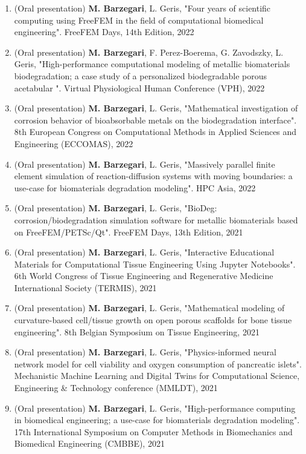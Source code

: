 \documentclass{cv}
\begin{document}
\begin{enumerate}[itemsep=-0.2ex]
\item
(Oral presentation) 
\textbf{M. Barzegari}, L. Geris, "Four years of scientific computing using FreeFEM in the field of computational biomedical engineering". FreeFEM Days, 14th Edition, 2022
\item
(Oral presentation) 
\textbf{M. Barzegari}, F. Perez-Boerema, G. Zavodszky, L. Geris, "High-performance computational modeling of metallic biomaterials biodegradation; a case study of a personalized biodegradable porous acetabular ". Virtual Physiological Human Conference (VPH), 2022
\item
(Oral presentation) 
\textbf{M. Barzegari}, L. Geris, "Mathematical investigation of corrosion behavior of bioabsorbable metals on the biodegradation interface". 8th European Congress on Computational Methods in Applied Sciences and Engineering (ECCOMAS), 2022
\item
(Oral presentation) 
\textbf{M. Barzegari}, L. Geris, "Massively parallel finite element simulation of reaction-diffusion systems with moving boundaries: a use-case for biomaterials degradation modeling". HPC Asia, 2022
\item
(Oral presentation) 
\textbf{M. Barzegari}, L. Geris, "BioDeg: corrosion/biodegradation simulation software for metallic biomaterials based on FreeFEM/PETSc/Qt". FreeFEM Days, 13th Edition, 2021
\item
(Oral presentation) 
\textbf{M. Barzegari}, L. Geris, "Interactive Educational Materials for Computational Tissue Engineering Using Jupyter Notebooks". 6th World Congress of Tissue Engineering and Regenerative Medicine International Society (TERMIS), 2021
\item
(Oral presentation) 
\textbf{M. Barzegari}, L. Geris, "Mathematical modeling of curvature-based cell/tissue growth on open porous scaffolds for bone tissue engineering". 8th Belgian Symposium on Tissue Engineering, 2021
\item
(Oral presentation)
\textbf{M. Barzegari}, L. Geris, "Physics-informed neural network model for cell viability and oxygen consumption of pancreatic islets". Mechanistic Machine Learning and Digital Twins for Computational Science, Engineering \& Technology conference (MMLDT), 2021
\item
(Oral presentation)
\textbf{M. Barzegari}, L. Geris, "High-performance computing in biomedical engineering; a use-case for biomaterials degradation modeling". 17th International Symposium on Computer Methods in Biomechanics and Biomedical Engineering (CMBBE), 2021

\end{enumerate}
\end{document}
